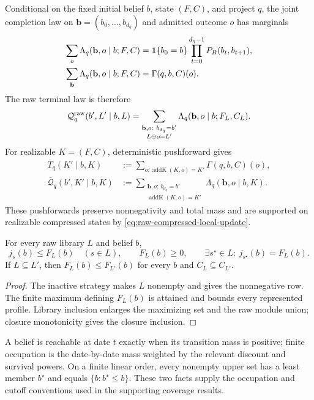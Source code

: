Conditional on the fixed initial belief \(b\), state \((F,C)\), and project
\(q\), the joint completion law on
\(\mathbf b=(b_0,\ldots,b_{d_q})\) and admitted outcome \(o\) has marginals
\begin{align}
  \sum_o\Lambda_q(\mathbf b,o\mid b;F,C)
    &=\mathbf{1}\{b_0=b\}\prod_{t=0}^{d_q-1}P_B(b_t,b_{t+1}),
    \label{eq:completion-path-marginal}\\
  \sum_{\mathbf b}\Lambda_q(\mathbf b,o\mid b;F,C)
    &=\Gamma(q,b,C)(o).
    \label{eq:completion-outcome-marginal}
\end{align}
The raw terminal law is therefore
\[
  \mathcal Q_q^{\rm raw}(b',L'\mid b,L)
  =\sum_{\substack{\mathbf b,o:\ b_{d_q}=b'\\L\oplus o=L'}}
    \Lambda_q(\mathbf b,o\mid b;F_L,C_L).
\]
For realizable \(K=(F,C)\), deterministic pushforward gives
\begin{align}
  \overline T_q(K'\mid b,K)
    &:=\sum_{o:\operatorname{addK}(K,o)=K'}\Gamma(q,b,C)(o),
    \label{eq:induced-compressed-marginal}\\
  \overline{\mathcal Q}_q(b',K'\mid b,K)
    &:=\sum_{\substack{\mathbf b,o:\ b_{d_q}=b'\\
        \operatorname{addK}(K,o)=K'}}
        \Lambda_q(\mathbf b,o\mid b,K).
    \label{eq:induced-compressed-joint}
\end{align}
These pushforwards preserve nonnegativity and total mass and are supported on
realizable compressed states by
\eqref{eq:raw-compressed-local-update}.

\begin{lemma}
\label{lem:frontier-closure-calculus}
For every raw library \(L\) and belief \(b\),
\[
  j_s(b)\le F_L(b)\quad(s\in L),
  \qquad F_L(b)\ge0,
  \qquad \exists s^\star\in L:\ j_{s^\star}(b)=F_L(b).
\]
If \(L\subseteq L'\), then \(F_L(b)\le F_{L'}(b)\) for every \(b\) and
\(C_L\subseteq C_{L'}\).
\end{lemma}

\begin{proof}
The inactive strategy makes \(L\) nonempty and gives the nonnegative row.
The finite maximum defining \(F_L(b)\) is attained and bounds every represented
profile.  Library inclusion enlarges the maximizing set and the raw module
union; closure monotonicity gives the closure inclusion.
\end{proof}

A belief is reachable at date \(t\) exactly when its transition mass is
positive; finite occupation is the date-by-date mass weighted by the relevant
discount and survival powers.  On a finite linear order, every nonempty upper
set has a least member \(b^\star\) and equals
\(\{b:b^\star\le b\}\).  These two facts supply the occupation and cutoff
conventions used in the supporting coverage results.

